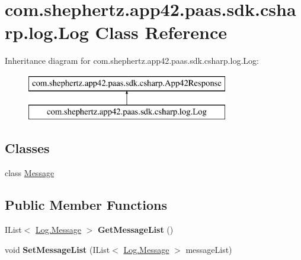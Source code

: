 \hypertarget{classcom_1_1shephertz_1_1app42_1_1paas_1_1sdk_1_1csharp_1_1log_1_1_log}{\section{com.\+shephertz.\+app42.\+paas.\+sdk.\+csharp.\+log.\+Log Class Reference}
\label{classcom_1_1shephertz_1_1app42_1_1paas_1_1sdk_1_1csharp_1_1log_1_1_log}
}
Inheritance diagram for com.\+shephertz.\+app42.\+paas.\+sdk.\+csharp.\+log.\+Log\+:\begin{figure}[H]
\begin{center}
\leavevmode
\includegraphics[height=2.000000cm]{classcom_1_1shephertz_1_1app42_1_1paas_1_1sdk_1_1csharp_1_1log_1_1_log}
\end{center}
\end{figure}
\subsection*{Classes}
\begin{DoxyCompactItemize}
\item 
class \hyperlink{classcom_1_1shephertz_1_1app42_1_1paas_1_1sdk_1_1csharp_1_1log_1_1_log_1_1_message}{Message}
\end{DoxyCompactItemize}
\subsection*{Public Member Functions}
\begin{DoxyCompactItemize}
\item 
\hypertarget{classcom_1_1shephertz_1_1app42_1_1paas_1_1sdk_1_1csharp_1_1log_1_1_log_a55dd13c614753f113d406d0e0c70559a}{I\+List$<$ \hyperlink{classcom_1_1shephertz_1_1app42_1_1paas_1_1sdk_1_1csharp_1_1log_1_1_log_1_1_message}{Log.\+Message} $>$ {\bfseries Get\+Message\+List} ()}\label{classcom_1_1shephertz_1_1app42_1_1paas_1_1sdk_1_1csharp_1_1log_1_1_log_a55dd13c614753f113d406d0e0c70559a}

\item 
\hypertarget{classcom_1_1shephertz_1_1app42_1_1paas_1_1sdk_1_1csharp_1_1log_1_1_log_a5648486e2220d74f06241aae95f1cc59}{void {\bfseries Set\+Message\+List} (I\+List$<$ \hyperlink{classcom_1_1shephertz_1_1app42_1_1paas_1_1sdk_1_1csharp_1_1log_1_1_log_1_1_message}{Log.\+Message} $>$ message\+List)}\label{classcom_1_1shephertz_1_1app42_1_1paas_1_1sdk_1_1csharp_1_1log_1_1_log_a5648486e2220d74f06241aae95f1cc59}

\end{DoxyCompactItemize}
